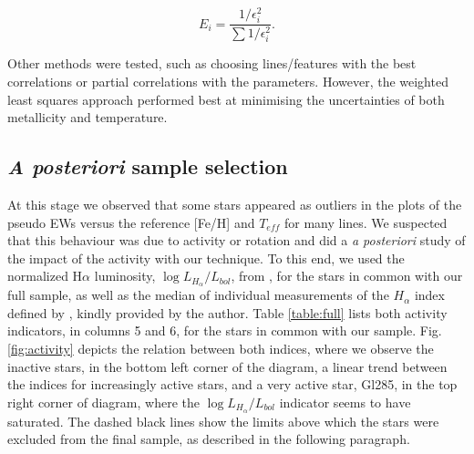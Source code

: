 \documentclass[referee]{aa}
\begin{document}


\begin{equation}
E_{i} = \frac{1/\epsilon_{i}^{2}}{\sum{1/\epsilon_{i}^{2}}}.
\label{eq:weight}
\end{equation}

Other methods were tested, such as choosing lines/features with the best correlations or partial correlations with the parameters. However, the weighted least squares approach performed best at minimising the uncertainties of both metallicity and temperature. 

\subsection{\textit{A posteriori} sample selection}
\label{sec:sample}

At this stage we observed that some stars appeared as outliers in the plots of the pseudo EWs versus the reference [Fe/H] and $T_{eff}$ for many lines. We suspected that this behaviour was due to activity or rotation and did a \textit{a posteriori} study of the impact of the activity with our technique. To this end, we used the normalized H$\alpha$ luminosity, $\log{L_{H_{\alpha}}/L_{bol}}$, from \citet{Reiners-2012}, for the stars in common with our full sample, as well as the median of individual measurements of the $H_{\alpha}$ index defined by \citet{Gomes_da_Silva-2011}, kindly provided by the author. Table \ref{table:full} lists both activity indicators, in columns 5 and 6, for the stars in common with our sample. Fig. \ref{fig:activity} depicts the relation between both indices, where we observe the inactive stars, in the bottom left corner of the diagram, a linear trend between the indices for increasingly active stars, and a very active star, Gl285, in the top right corner of diagram, where the  $\log{L_{H_{\alpha}}/L_{bol}}$ indicator seems to have saturated. The dashed black lines show the limits above which the stars were excluded from the final sample, as described in the following paragraph. 
\end{document}
